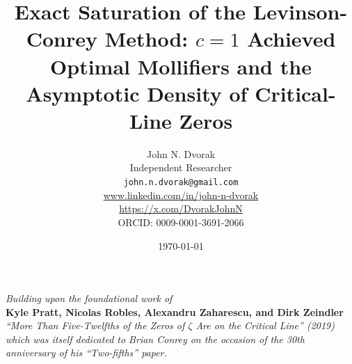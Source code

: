 \documentclass[11pt]{article}
\title{Exact Saturation of the Levinson-Conrey Method: $c = 1$ Achieved\\
\large Optimal Mollifiers and the Asymptotic Density of Critical-Line Zeros}
\author{John N. Dvorak \\
\small Independent Researcher \\
\small \texttt{john.n.dvorak@gmail.com} \\
\small \url{www.linkedin.com/in/john-n-dvorak} \\
\small \url{https://x.com/DvorakJohnN} \\
\small ORCID: 0009-0001-3691-2066}
\date{\today}
\begin{document}
\maketitle

\begin{center}
\textit{Building upon the foundational work of}\\[3pt]
\textbf{Kyle Pratt, Nicolas Robles, Alexandru Zaharescu, and Dirk Zeindler}\\[3pt]
\textit{``More Than Five-Twelfths of the Zeros of $\zeta$ Are on the Critical Line'' (2019)}\\[6pt]
\textit{which was itself dedicated to Brian Conrey on the occasion of the 30th anniversary of his ``Two-fifths'' paper.}
\end{center}

\vspace{1em}
\end{document}
